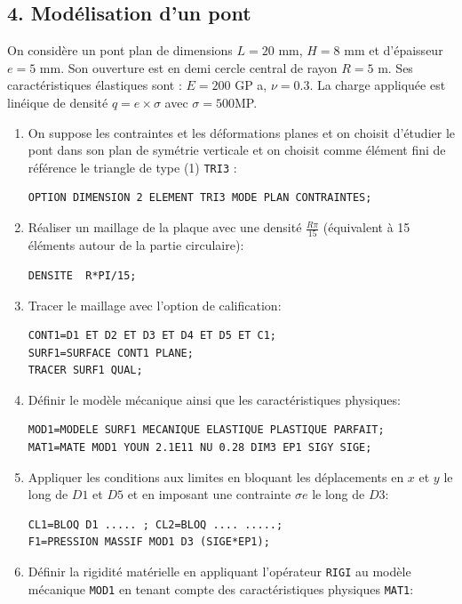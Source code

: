 \documentclass[a4paper,multicol]{article}
\begin{document}
 \subsection*{4. Modélisation d'un pont}
 On considère un pont plan de dimensions $L = 20$ mm, $H = 8$ mm et d'épaisseur $e =5$ mm. Son ouverture est en demi cercle central de rayon $R = 5$ m. Ses caractéristiques élastiques sont :
$E = 200$ GP a, $\nu= 0.3$. La charge appliquée est linéique de densité $q = e\times \sigma$ avec 
$\sigma = 500$MP.

\begin{enumerate}
\item On suppose les contraintes et les déformations planes et on choisit d'étudier le pont dans son plan de symétrie verticale et on choisit comme élément fini de référence le triangle de type (1) {\tt TRI3} :
\begin{verbatim}
OPTION DIMENSION 2 ELEMENT TRI3 MODE PLAN CONTRAINTES;
\end{verbatim}
\item  Réaliser un maillage de la plaque avec une densité $\frac{R\pi}{15}$ (équivalent à 15 éléments autour de la partie circulaire):
\begin{verbatim}
DENSITE  R*PI/15;
\end{verbatim}
\item Tracer le maillage avec l'option de calification:
\begin{verbatim}
CONT1=D1 ET D2 ET D3 ET D4 ET D5 ET C1;
SURF1=SURFACE CONT1 PLANE;
TRACER SURF1 QUAL;
\end{verbatim}
\item  Définir le modèle mécanique ainsi que les caractéristiques physiques:
\begin{verbatim}
MOD1=MODELE SURF1 MECANIQUE ELASTIQUE PLASTIQUE PARFAIT;
MAT1=MATE MOD1 YOUN 2.1E11 NU 0.28 DIM3 EP1 SIGY SIGE;
\end{verbatim} 
\item  Appliquer les conditions aux limites en bloquant les déplacements en $x$ et $y$ le long de $D1$ et $D5$ et en imposant une contrainte $\sigma e$ le long de $D3$:
\begin{verbatim}
CL1=BLOQ D1 ..... ; CL2=BLOQ .... .....;
F1=PRESSION MASSIF MOD1 D3 (SIGE*EP1);
\end{verbatim}
\item Définir la rigidité matérielle en appliquant l'opérateur {\tt RIGI} au modèle mécanique {\tt MOD1} en tenant compte des caractéristiques physiques {\tt MAT1}: 
\begin{verbatim}

\end{verbatim}
\end{enumerate}
\end{document}
